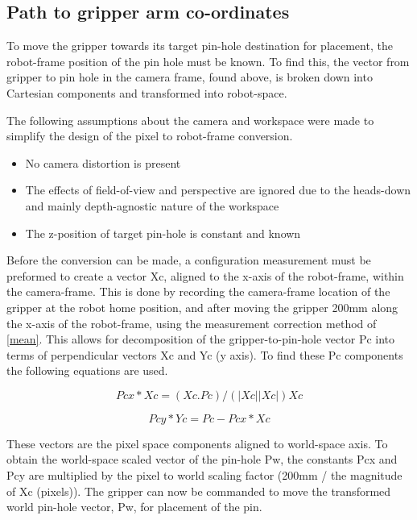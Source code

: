 \documentclass[11pt,a4paper]{report}
\begin{document}
\subsection{Path to gripper arm co-ordinates}

To move the gripper towards its target pin-hole destination for placement, the robot-frame position of the pin hole must be known. To find this, the vector from gripper to pin hole in the camera frame,  found above, is broken down into Cartesian components and transformed into robot-space.

The following assumptions about the camera and workspace were made to simplify the design of the pixel to robot-frame conversion.
\begin{itemize}
	\item No camera distortion is present
	\item The effects of field-of-view and perspective are ignored due to the heads-down and mainly depth-agnostic nature of the workspace
	\item The z-position of target pin-hole is constant and known
\end{itemize}

Before the conversion can be made, a configuration measurement must be preformed to create a vector Xc, aligned to the x-axis of the robot-frame, within the camera-frame. This is done by recording the camera-frame location of the gripper at the robot home position, and after moving the gripper 200mm along the x-axis of the robot-frame, using the measurement correction method of \cref{mean}. This allows for decomposition of the gripper-to-pin-hole vector Pc into terms of perpendicular vectors Xc and Yc (y axis). To find these Pc components the following equations are used. 

\begin{equation}
Pcx*Xc = (Xc.Pc)/(|Xc||Xc|)Xc
\label{eq:redest}
\end{equation}

\begin{equation}
Pcy*Yc = Pc - Pcx*Xc
\label{eq:redest}
\end{equation}

These vectors are the pixel space components aligned to world-space axis. To obtain the world-space scaled vector of the pin-hole Pw, the constants Pcx and Pcy are multiplied by the pixel to world scaling factor (200mm / the magnitude of Xc (pixels)). The gripper can now be commanded to move the transformed world pin-hole vector, Pw, for placement of the pin.
\end{document}
